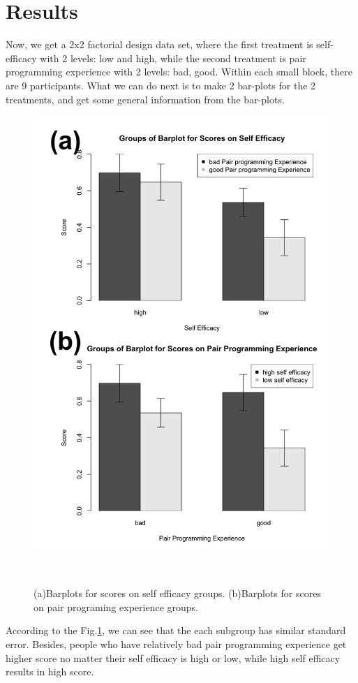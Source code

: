 \documentclass{sigchi}
\begin{document}
\section{Results}

Now, we get a 2x2 factorial design data set, where the first treatment is self-efficacy with 2 levels: low and high, while the second treatment is pair programming experience with 2 levels: bad, good. Within each small block, there are 9 participants. What we can do next is to make 2 bar-plots for the 2 treatments, and get some general information from the bar-plots.

\begin{figure}
\centering
  \includegraphics[width=0.8\columnwidth]{figures/fig3}
  \caption{(a)Barplots for scores on self efficacy groups. (b)Barplots for scores on pair programing experience groups.}~\label{fig:figure3}
\end{figure}

According to the Fig.\ref{fig:figure3}, we can see that the each subgroup has similar standard error. Besides, people who have relatively bad pair programming experience get higher score no matter their self efficacy is high or low, while high self efficacy results in high score. 
\end{document}
